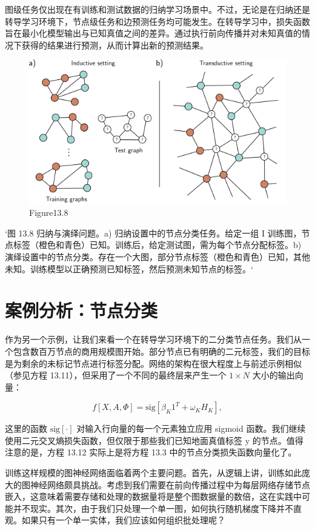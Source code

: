图级任务仅出现在有训练和测试数据的归纳学习场景中。不过，无论是在归纳还是转导学习环境下，节点级任务和边预测任务均可能发生。在转导学习中，损失函数旨在最小化模型输出与已知真值之间的差异。通过执行前向传播并对未知真值的情况下获得的结果进行预测，从而计算出新的预测结果。

\begin{figure}[ht!]
\centering
\includegraphics[width=0.7\linewidth]{png/chapter13/GraphInductiveTransductive.png}
\caption{Figure13.8}
\end{figure}

`图 13.8 归纳与演绎问题。a) 归纳设置中的节点分类任务。给定一组 I 训练图，节点标签（橙色和青色）已知。训练后，给定测试图，需为每个节点分配标签。b) 演绎设置中的节点分类。存在一个大图，部分节点标签（橙色和青色）已知，其他未知。训练模型以正确预测已知标签，然后预测未知节点的标签。`
\section{案例分析：节点分类}
作为另一个示例，让我们来看一个在转导学习环境下的二分类节点任务。我们从一个包含数百万节点的商用规模图开始。部分节点已有明确的二元标签，我们的目标是为剩余的未标记节点进行标签分配。网络的架构在很大程度上与前述示例相似（参见方程 13.11），但采用了一个不同的最终层来产生一个 \(1 \times N\) 大小的输出向量：

\[
f[X, A, \Phi] = \text{sig} [\beta_K 1^T + \omega_K H_K ], \tag{13.12}
\]

这里的函数 \(\text{sig}[\cdot]\) 对输入行向量的每一个元素独立应用 sigmoid 函数。我们继续使用二元交叉熵损失函数，但仅限于那些我们已知地面真值标签 y 的节点。值得注意的是，方程 13.12 实际上是将方程 13.3 中的节点分类损失函数向量化了。

训练这样规模的图神经网络面临着两个主要问题。首先，从逻辑上讲，训练如此庞大的图神经网络颇具挑战。考虑到我们需要在前向传播过程中为每层网络存储节点嵌入，这意味着需要存储和处理的数据量将是整个图数据量的数倍，这在实践中可能并不现实。其次，由于我们只处理一个单一图，如何执行随机梯度下降并不直观。如果只有一个单一实体，我们应该如何组织批处理呢？
